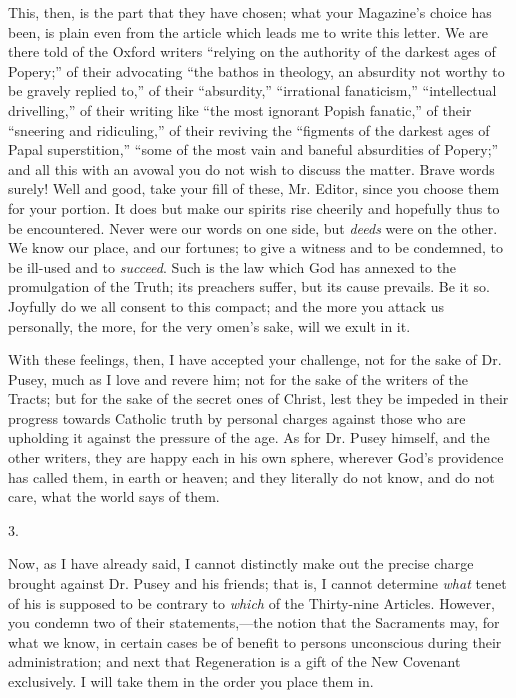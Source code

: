 This, then, is the part that they have chosen;
what your Magazine's choice has been, is plain even from the article
which leads me to write this letter. We are there told of the Oxford
writers ``relying on the authority of the darkest ages of Popery;'' of
their advocating ``the bathos in theology, an absurdity not worthy to
be gravely replied to,'' of their ``absurdity,'' ``irrational fanaticism,''
``intellectual drivelling,'' of their writing like ``the most ignorant
Popish fanatic,'' of their ``sneering and ridiculing,'' of their reviving
the ``figments of the darkest ages of Papal superstition,'' ``some of the
most vain and baneful absurdities of Popery;'' and all this with
an avowal you do not wish to discuss the matter. Brave words surely!
Well and good, take your fill of these, Mr. Editor, since you choose
them for your portion. It does but make our spirits rise cheerily and
hopefully thus to be encountered. Never were our words on one side,
but \emph{deeds} were on the other. We know our place, and our
fortunes; to give a witness and to be condemned, to be ill-used and to
\emph{succeed}. Such is the law which God has annexed to the
promulgation of the Truth; its preachers suffer, but its cause
prevails. Be it so. Joyfully do we all consent to this compact; and
the more you attack us personally, the more, for the very omen's sake,
will we exult in it.

With these feelings, then, I have accepted your
challenge, not for the sake of Dr. Pusey, much as I love and revere
him; not for the sake of the writers of the Tracts; but for the sake
of the secret ones of Christ, lest they be impeded in their progress
towards Catholic truth by personal charges against those who are
upholding it against the pressure of the age. As for Dr. Pusey
himself, and the other writers, they are happy each in his own sphere,
wherever God's providence has called them, in earth or heaven; and
they literally do not know, and do not care, what the world says of
them.

3.

Now, as I have already said, I cannot distinctly
make out the precise charge brought against Dr. Pusey and his friends;
that is, I cannot determine \emph{what} tenet of his is supposed to be
contrary to \emph{which} of the Thirty-nine Articles. However, you
condemn two of their statements,—the notion that the Sacraments may,
for what we know, in certain cases be of benefit to persons
unconscious during their administration; and next that Regeneration is
a gift of the New Covenant exclusively. I will take them in the
order you place them in.

